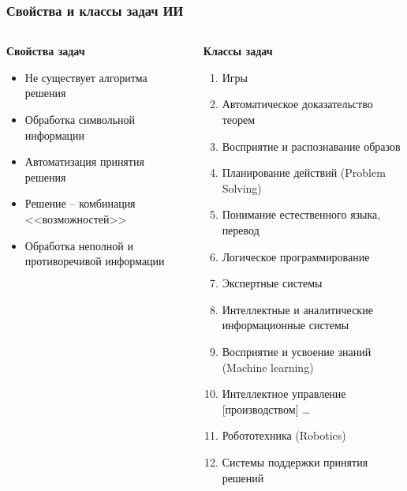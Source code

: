\documentclass[10pt]{beamer}
\begin{document}
\begin{frame}
  \frametitle{Свойства и классы задач ИИ}
  \small
\begin{columns}
  \begin{column}{0.4\textwidth}
    \textbf{Свойства задач}
    \begin{itemize}
    \item Не существует алгоритма решения
    \item Обработка символьной информации
    \item Автоматизация принятия решения
    \item Решение -- комбинация <<возможностей>>
    \item Обработка неполной и противоречивой информации
    \end{itemize}
    \vspace{6.5em}
    \mbox{}
  \end{column}
  \begin{column}{0.6\textwidth}
    \textbf{Классы задач}
    \begin{enumerate}
    \item Игры
    \item Автоматическое доказательство теорем
    \item Восприятие и распознавание образов
    \item Планирование действий (Problem Solving)
    \item Понимание естественного языка, перевод
    \item Логическое программирование
    \item Экспертные системы
    \item Интеллектные и аналитические информационные системы
    \item Восприятие и усвоение знаний (Machine learning)
    \item Интеллектное управление [производством] \ldots
    \item Робототехника (Robotics)
    \item Системы поддержки принятия решений
    \end{enumerate}
  \end{column}
\end{columns}
\end{frame}
\end{document}
